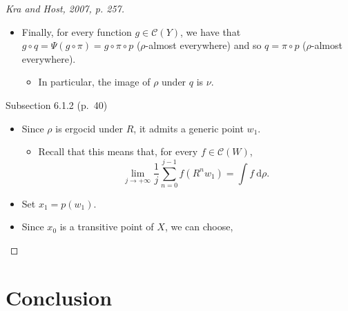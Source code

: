 \documentclass[
  british,
]{article}
\providecommand{\tightlist}{%
  \setlength{\itemsep}{0pt}\setlength{\parskip}{0pt}}
\theoremstyle{plain}
\theoremstyle{definition}
\theoremstyle{plain}
\theoremstyle{remark}
\begin{document}
\begin{proof}[{Kra and Host, 2007, p. 257}]
\begin{itemize}
  \begin{itemize}
  \tightlist
  \item
    Indeed, the range of the map
    \[f\mapsto f\circ p:\text{L}^2(\mu)\rightarrow\text{L}^2(\rho) \] is
    closed in \(\text{L}^2(\rho)\) becuase this map is an isometry, and
    it contains \(\Psi(\mathcal{B})=\mathcal{C}(W)\) and thus it is
    equal to \(\text{L}^2(\rho)\).

    \begin{itemize}
    \tightlist
    \item
      In particular, \((W,\rho,R)\) is ergodic.
    \end{itemize}
  \end{itemize}
\item
  Finally, for every function \(g\in\mathcal{C}(Y)\), we have that
  \(g\circ q=\Psi(g\circ\pi)=g\circ\pi\circ p\) (\(\rho\)-almost
  everywhere) and so \(q=\pi\circ p\) (\(\rho\)-almost everywhere).

  \begin{itemize}
  \tightlist
  \item
    In particular, the image of \(\rho\) under \(q\) is \(\nu\).
  \end{itemize}
\end{itemize}

Subsection 6.1.2 (p.~40)

\begin{itemize}
\tightlist
\item
  Since \(\rho\) is ergocid under \(R\), it admits a generic point
  \(w_1\).

  \begin{itemize}
  \tightlist
  \item
    Recall that this means that, for every \(f\in\mathcal{C}(W)\),
    \[\lim_{j\rightarrow+\infty}\frac{1}{j}\sum_{n=0}^{j-1}f(R^nw_1)=\int f\ \mathrm{d}\rho. \]
  \end{itemize}
\item
  Set \(x_1=p(w_1)\).
\item
  Since \(x_0\) is a transitive point of \(X\), we can choose,
\end{itemize}

\end{proof}

\section{Conclusion}\label{conclusion}
\end{document}
